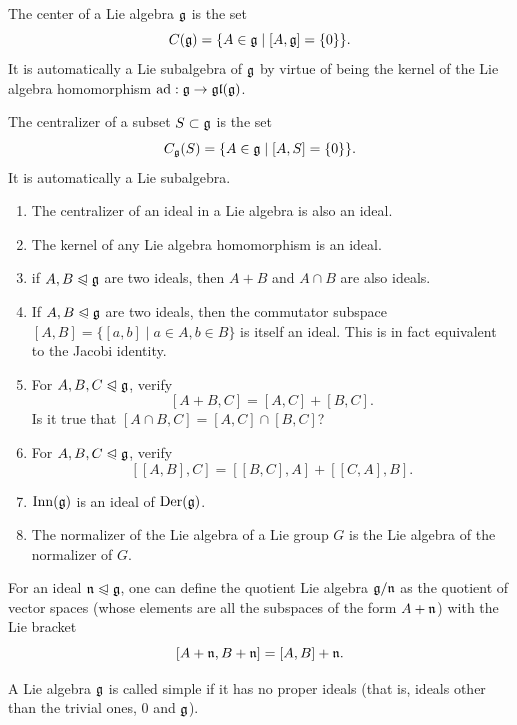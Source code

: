 \begin{defn}
    The center of a Lie algebra $\mathfrak{g}$ is the set
    \[C(\mathfrak{g})=\{A\in\mathfrak{g}\mid [A,\mathfrak{g}]=\{0\}\}.\]
    It is automatically a Lie subalgebra of $\mathfrak{g}$ by virtue of being the kernel of the Lie algebra homomorphism $\mathrm{ad}:\mathfrak{g}\to \mathfrak{gl}(\mathfrak{g})$.
\end{defn}

\begin{defn}[Centralizer]
    The centralizer of a subset $S\subset\mathfrak{g}$ is the set
    \[C_{\mathfrak{g}}(S)=\{A\in\mathfrak{g}\mid [A,S]=\{0\}\}.\]
    It is automatically a Lie subalgebra.
\end{defn}

\begin{xca}
\begin{enumerate}
    \item The centralizer of an ideal in a Lie algebra is also an ideal.
    \item The kernel of any Lie algebra homomorphism is an ideal.
    \item if $A,B\trianglelefteqslant\mathfrak{g}$ are two ideals, then $A+B$ and $A\cap B$ are also ideals.
    \item If $A,B\trianglelefteqslant \mathfrak{g}$ are two ideals, then the commutator subspace $[A,B]=\{[a,b]\mid a\in A,b\in B\}$ is itself an ideal. This is in fact equivalent to the Jacobi identity.
    \item For $A,B,C\trianglelefteqslant \mathfrak{g}$, verify
    \[[A+B,C]=[A,C]+[B,C].\]
    Is it true that $[A\cap B,C]=[A,C]\cap [B,C]$?
    \item For $A,B,C\trianglelefteqslant \mathfrak{g}$, verify
    \[[[A,B],C]=[[B,C],A]+[[C,A],B].\]
    \item $\operatorname{Inn}(\mathfrak{g})$ is an ideal of $\operatorname{Der}(\mathfrak{g})$.
    \item The normalizer of the Lie algebra of a Lie group $G$ is the Lie algebra of the normalizer of $G$.
\end{enumerate}
\end{xca}

\begin{defn}
    For an ideal $\mathfrak{n}\trianglelefteqslant\mathfrak{g}$, one can define the quotient Lie algebra $\mathfrak{g}\slash \mathfrak{n}$ as the quotient of vector spaces (whose elements are all the subspaces of the form $A+\mathfrak{n}$) with the Lie bracket
    \[[A+\mathfrak{n},B+\mathfrak{n}]=[A,B]+\mathfrak{n}.\]
\end{defn}

\begin{defn}
    A Lie algebra $\mathfrak{g}$ is called simple if it has no proper ideals (that is, ideals other than the trivial ones, $0$ and $\mathfrak{g}$).
\end{defn}


